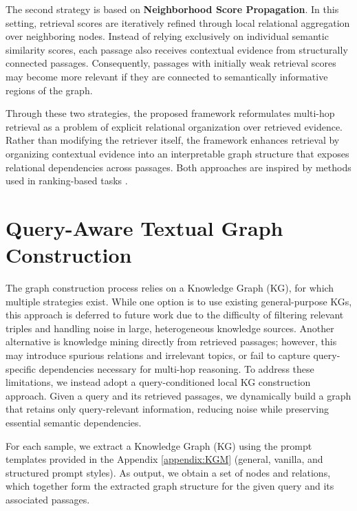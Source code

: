 \documentclass[11pt]{article}
\begin{document}
The second strategy is based on \textbf{Neighborhood Score Propagation}. In this setting, retrieval scores are iteratively refined through local relational aggregation over neighboring nodes. Instead of relying exclusively on individual semantic similarity scores, each passage also receives contextual evidence from structurally connected passages. Consequently, passages with initially weak retrieval scores may become more relevant if they are connected to semantically informative regions of the graph.


Through these two strategies, the proposed framework reformulates multi-hop retrieval as a problem of explicit relational organization over retrieved evidence. Rather than modifying the retriever itself, the framework enhances retrieval by organizing contextual evidence into an interpretable graph structure that exposes relational dependencies across passages.
Both approaches are inspired by methods used in ranking-based tasks \cite{DBLP:conf/aaai/QianWD15, DBLP:journals/ipm/OtterbacherER09}.



\section{Query-Aware Textual Graph Construction}\label{section:QATG}


The graph construction process relies on a Knowledge Graph (KG), for which multiple strategies exist. While one option is to use existing general-purpose KGs, this approach is deferred to future work due to the difficulty of filtering relevant triples and handling noise in large, heterogeneous knowledge sources. Another alternative is knowledge mining directly from retrieved passages; however, this may introduce spurious relations and irrelevant topics, or fail to capture query-specific dependencies necessary for multi-hop reasoning.
To address these limitations, we instead adopt a query-conditioned local KG construction approach. Given a query and its retrieved passages, we dynamically build a graph that retains only query-relevant information, reducing noise while preserving essential semantic dependencies.

For each sample, we extract a Knowledge Graph (KG) using the prompt templates provided in the Appendix \ref{appendix:KGM} (general, vanilla, and structured prompt styles). As output, we obtain a set of nodes and relations, which together form the extracted graph structure for the given query and its associated passages.
\end{document}
